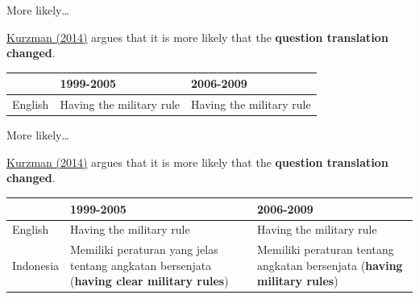 \documentclass[10pt]{beamer}
\begin{document}
\begin{frame}{More likely\ldots}

    \href{https://www.washingtonpost.com/news/monkey-cage/wp/2014/09/02/world-values-lost-in-translation/}{Kurzman (2014)} argues that it is more likely that the \textbf{question translation changed}.
{\small{
    \begin{table}
        \begin{tabular}{l p{3.5cm} p{3.5cm}}
        \hline
        & 1999-2005 & 2006-2009\\
        \hline\hline
        English & Having the military rule & Having the military rule \\

        \hline
        \end{tabular}
    \end{table}

}}

\end{frame}

\begin{frame}{More likely\ldots}

    \href{https://www.washingtonpost.com/news/monkey-cage/wp/2014/09/02/world-values-lost-in-translation/}{Kurzman (2014)} argues that it is more likely that the \textbf{question translation changed}.
{\small{
    \begin{table}
        \begin{tabular}{l p{3.5cm} p{3.5cm}}
        \hline
        & 1999-2005 & 2006-2009\\
        \hline\hline
        English & Having the military rule & Having the military rule \\

        Indonesia & Memiliki peraturan yang jelas tentang angkatan bersenjata (\textbf{having clear military rules}) & Memiliki peraturan tentang angkatan bersenjata (\textbf{having military rules})\\

        \hline
        \end{tabular}
    \end{table}

}}

\end{frame}
\end{document}

